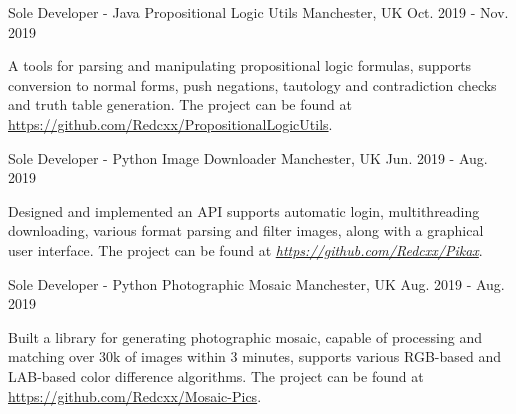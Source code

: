 \begin{cventries}

  \cventry
    {Sole Developer - Java} %
    {Propositional Logic Utils} %
    {Manchester, UK} %
    {Oct. 2019 - Nov. 2019} %
    {
      \begin{cvitems} %
        \item {A tools for parsing and manipulating propositional logic formulas, supports conversion to normal forms, push negations, tautology and contradiction checks and truth table generation. The project can be found at \href{https://github.com/Redcxx/PropositionalLogicUtils}{https://github.com/Redcxx/PropositionalLogicUtils}.}
      \end{cvitems}
    }

  \cventry
    {Sole Developer - Python} %
    {Image Downloader} %
    {Manchester, UK} %
    {Jun. 2019 - Aug. 2019} %
    {
      \begin{cvitems} %
        \item {Designed and implemented an API supports automatic login, multithreading downloading, various format parsing and filter images, along with a graphical user interface. The project can be found at \href{https://github.com/Redcxx/Pikax}{\textit{https://github.com/Redcxx/Pikax}}.}
      \end{cvitems}
    }
  
    
  \cventry
  {Sole Developer - Python} %
  {Photographic Mosaic} %
  {Manchester, UK} %
  {Aug. 2019 - Aug. 2019} %
  {
    \begin{cvitems} %
      \item {Built a library for generating photographic mosaic, capable of processing and matching over 30k of images within 3 minutes, supports various RGB-based and LAB-based color difference algorithms. The project can be found at \href{https://github.com/Redcxx/Mosaic-Pics}{https://github.com/Redcxx/Mosaic-Pics}.}
    \end{cvitems}
  }


\end{cventries}
